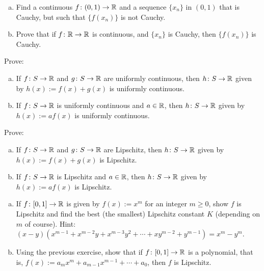 \begin{samepage}
\begin{exercise}
\leavevmode
\begin{enumerate}[a)]
\item
Find a continuous $f \colon (0,1) \to {\mathbb{R}}$ and a sequence $\{ x_n \}$ in
$(0,1)$ that is Cauchy, but such that $\bigl\{ f(x_n) \bigr\}$ is not Cauchy.
\item
Prove that if $f \colon {\mathbb{R}} \to {\mathbb{R}}$ is continuous, and $\{ x_n \}$ is
Cauchy, then $\bigl\{ f(x_n) \bigr\}$ is Cauchy.
\end{enumerate}
\end{exercise}
\end{samepage}

\begin{samepage}
\begin{exercise}
Prove:
\begin{enumerate}[a)]
\item
If $f \colon S \to {\mathbb{R}}$ and $g \colon S \to {\mathbb{R}}$ are uniformly continuous,
then $h \colon S \to {\mathbb{R}}$ given by $h(x) := f(x) + g(x)$
is uniformly continuous.
\item
If $f \colon S \to {\mathbb{R}}$ is uniformly continuous and $a \in {\mathbb{R}}$,
then $h \colon S \to {\mathbb{R}}$ given by $h(x) := a f(x)$
is uniformly continuous.
\end{enumerate}
\end{exercise}
\end{samepage}

\begin{exercise}
Prove:
\begin{enumerate}[a)]
\item
If $f \colon S \to {\mathbb{R}}$ and $g \colon S \to {\mathbb{R}}$ are Lipschitz,
then $h \colon S \to {\mathbb{R}}$ given by $h(x) := f(x) + g(x)$
is Lipschitz.
\item
If $f \colon S \to {\mathbb{R}}$ is Lipschitz and $a \in {\mathbb{R}}$,
then $h \colon S \to {\mathbb{R}}$ given by $h(x) := a f(x)$
is Lipschitz.
\end{enumerate}
\end{exercise}

\begin{exercise}
\leavevmode
\begin{enumerate}[a)]
\item
If $f \colon [0,1] \to {\mathbb{R}}$ is given by $f(x) := x^m$ for an integer
$m \geq 0$,
show $f$ is Lipschitz and find the best (the smallest) Lipschitz constant
$K$ (depending on $m$ of course).
Hint: $(x-y)(x^{m-1} + x^{m-2}y + x^{m-3}y^2 + \cdots + x y^{m-2} + y^{m-1}) = x^m - y^m$.
\item
Using the previous exercise, show that if $f \colon [0,1] \to {\mathbb{R}}$
is a polynomial, that is, $f(x) := a_m x^m + a_{m-1} x^{m-1} + \cdots + a_0$,
then $f$ is Lipschitz.
\end{enumerate}
\end{exercise}

